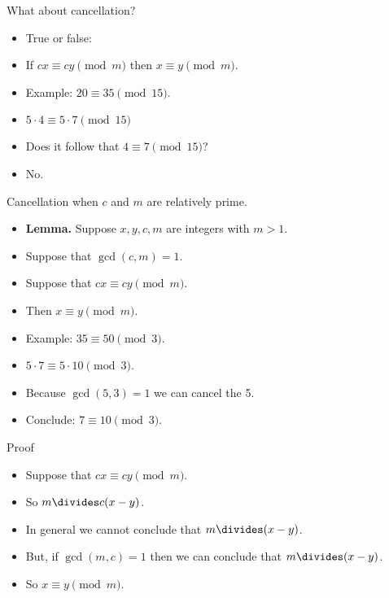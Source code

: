 \documentclass[handout]{beamer}
\begin{document}
\begin{frame}{What about cancellation?}

\begin{itemize}
  \item True or false:
  \item If $cx \equiv cy \pmod m$ then $x\equiv y \pmod m$.
  \item Example: $20 \equiv 35 \pmod {15}$.
  \item $5\cdot 4 \equiv 5 \cdot 7 \pmod {15}$
  \item Does it follow that $4 \equiv 7 \pmod {15}$?
  \item No.
\end{itemize}

\end{frame}

\begin{frame}{Cancellation when $c$ and $m$ are relatively prime.}
\begin{itemize}
  \item \textbf{Lemma.} Suppose $x,y,c,m$ are integers with $m>1$.
  \item Suppose that $\gcd(c, m) = 1$.
  \item Suppose that $cx \equiv cy \pmod m$.
  \item Then $x\equiv y \pmod m$.
  \item Example: $35 \equiv 50 \pmod 3$.
  \item $5\cdot 7 \equiv 5 \cdot 10 \pmod 3$.
  \item Because $\gcd(5,3) = 1$ we can cancel the 5.
  \item Conclude: $7\equiv 10 \pmod 3$.
\end{itemize}
\end{frame}

\begin{frame}{Proof}
\begin{itemize}
  \item Suppose that $cx \equiv cy \pmod m$.
  \item So $m \divides c(x-y)$.
  \item In general we cannot conclude that $m \divides (x-y)$.
  \item But, if $\gcd(m,c) = 1$ then we can conclude that $m\divides (x-y)$.
  \item So $x\equiv y \pmod m$.
\end{itemize}
\end{frame}
\end{document}
